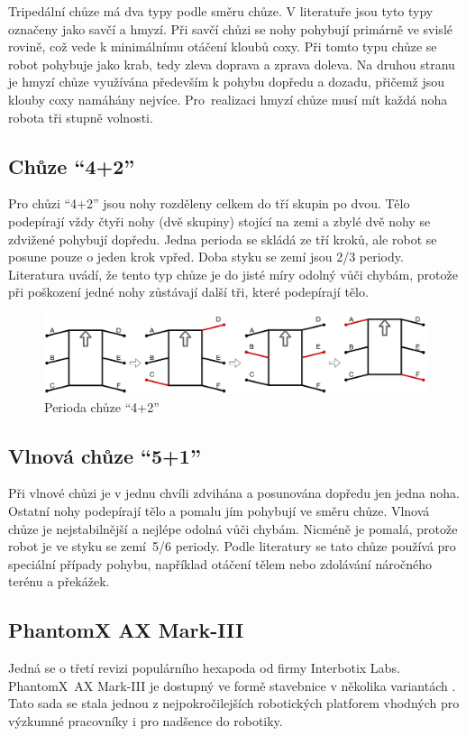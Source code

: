 Tripedální chůze má dva typy podle směru chůze. V literatuře \cite{HexapodSymetric} jsou tyto typy označeny jako savčí a hmyzí. Při savčí chůzi se nohy pohybují primárně ve svislé rovině, což vede k minimálnímu otáčení kloubů coxy. Při tomto typu chůze se robot pohybuje jako krab, tedy zleva doprava a zprava doleva. Na druhou stranu je hmyzí chůze využívána především k pohybu dopředu a dozadu, přičemž jsou klouby coxy namáhány nejvíce. Pro~realizaci hmyzí chůze musí mít každá noha robota tři stupně volnosti.

\subsection*{Chůze ``4+2''}
Pro chůzi ``4+2'' jsou nohy rozděleny celkem do tří skupin po dvou. Tělo podepírají vždy čtyři nohy (dvě skupiny) stojící na zemi a zbylé dvě nohy se zdvižené pohybují dopředu. Jedna perioda se skládá ze tří kroků, ale robot se posune pouze o jeden krok vpřed. Doba styku se zemí jsou 2/3 periody. Literatura \cite{HexapodSymetric} uvádí, že tento typ chůze je do jisté míry odolný vůči chybám, protože při poškození jedné nohy zůstávají další tři, které podepírají tělo.

\begin{figure}[hbt]
	\centering
	\includegraphics[width=1\textwidth]{obrazky-figures/42gait.png}
	\caption{Perioda chůze ``4+2''}
	\label{42gait}
\end{figure}

\subsection*{Vlnová chůze ``5+1''}
Při vlnové chůzi je v jednu chvíli zdvihána a posunována dopředu jen jedna noha. Ostatní nohy podepírají tělo a pomalu jím pohybují ve směru chůze. Vlnová chůze je nejstabilnější a nejlépe odolná vůči chybám. Nicméně je pomalá, protože robot je ve styku se zemí~5/6 periody. Podle literatury \cite{HexapodSymetric} se tato chůze používá pro speciální případy pohybu, například otáčení tělem nebo zdolávání náročného terénu a překážek.

\subsection*{PhantomX AX Mark-III}
Jedná se o třetí revizi populárního hexapoda od firmy Interbotix Labs. PhantomX~AX Mark-III je dostupný ve formě stavebnice v několika variantách \cite{PhantomX}. Tato sada se stala jednou z nejpokročilejších robotických platforem vhodných pro výzkumné pracovníky i pro nadšence do robotiky.

